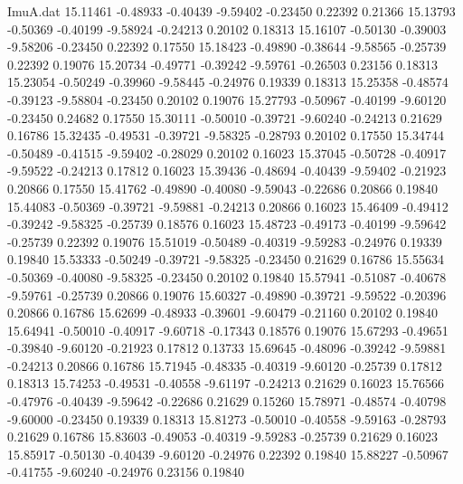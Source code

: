 \begin{filecontents}{ImuA.dat}
  15.11461   -0.48933   -0.40439   -9.59402   -0.23450    0.22392    0.21366
  15.13793   -0.50369   -0.40199   -9.58924   -0.24213    0.20102    0.18313
  15.16107   -0.50130   -0.39003   -9.58206   -0.23450    0.22392    0.17550
  15.18423   -0.49890   -0.38644   -9.58565   -0.25739    0.22392    0.19076
  15.20734   -0.49771   -0.39242   -9.59761   -0.26503    0.23156    0.18313
  15.23054   -0.50249   -0.39960   -9.58445   -0.24976    0.19339    0.18313
  15.25358   -0.48574   -0.39123   -9.58804   -0.23450    0.20102    0.19076
  15.27793   -0.50967   -0.40199   -9.60120   -0.23450    0.24682    0.17550
  15.30111   -0.50010   -0.39721   -9.60240   -0.24213    0.21629    0.16786
  15.32435   -0.49531   -0.39721   -9.58325   -0.28793    0.20102    0.17550
  15.34744   -0.50489   -0.41515   -9.59402   -0.28029    0.20102    0.16023
  15.37045   -0.50728   -0.40917   -9.59522   -0.24213    0.17812    0.16023
  15.39436   -0.48694   -0.40439   -9.59402   -0.21923    0.20866    0.17550
  15.41762   -0.49890   -0.40080   -9.59043   -0.22686    0.20866    0.19840
  15.44083   -0.50369   -0.39721   -9.59881   -0.24213    0.20866    0.16023
  15.46409   -0.49412   -0.39242   -9.58325   -0.25739    0.18576    0.16023
  15.48723   -0.49173   -0.40199   -9.59642   -0.25739    0.22392    0.19076
  15.51019   -0.50489   -0.40319   -9.59283   -0.24976    0.19339    0.19840
  15.53333   -0.50249   -0.39721   -9.58325   -0.23450    0.21629    0.16786
  15.55634   -0.50369   -0.40080   -9.58325   -0.23450    0.20102    0.19840
  15.57941   -0.51087   -0.40678   -9.59761   -0.25739    0.20866    0.19076
  15.60327   -0.49890   -0.39721   -9.59522   -0.20396    0.20866    0.16786
  15.62699   -0.48933   -0.39601   -9.60479   -0.21160    0.20102    0.19840
  15.64941   -0.50010   -0.40917   -9.60718   -0.17343    0.18576    0.19076
  15.67293   -0.49651   -0.39840   -9.60120   -0.21923    0.17812    0.13733
  15.69645   -0.48096   -0.39242   -9.59881   -0.24213    0.20866    0.16786
  15.71945   -0.48335   -0.40319   -9.60120   -0.25739    0.17812    0.18313
  15.74253   -0.49531   -0.40558   -9.61197   -0.24213    0.21629    0.16023
  15.76566   -0.47976   -0.40439   -9.59642   -0.22686    0.21629    0.15260
  15.78971   -0.48574   -0.40798   -9.60000   -0.23450    0.19339    0.18313
  15.81273   -0.50010   -0.40558   -9.59163   -0.28793    0.21629    0.16786
  15.83603   -0.49053   -0.40319   -9.59283   -0.25739    0.21629    0.16023
  15.85917   -0.50130   -0.40439   -9.60120   -0.24976    0.22392    0.19840
  15.88227   -0.50967   -0.41755   -9.60240   -0.24976    0.23156    0.19840

\end{filecontents}
